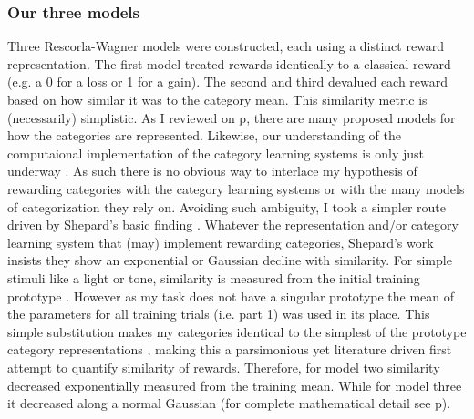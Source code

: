 \documentclass[doc,12pt]{apa}        %
\begin{document}
\subsubsection{Our three models}
\label{subsub:catquant}
Three Rescorla-Wagner models were constructed, each using a distinct reward representation.  The first model treated rewards identically to a classical reward (e.g. a 0 for a loss or 1 for a gain).  The second and third devalued each reward based on how similar it was to the category mean.  This similarity metric is (necessarily) simplistic.  As I reviewed on p\pageref{subsub:curves}, there are many proposed models for how the categories are represented.  Likewise, our understanding of the computaional implementation of the category learning systems is only just underway \cite{Ashby:2005p9152,Ashby:2006p9153}.  As such there is no obvious way to interlace my hypothesis of rewarding categories with the category learning systems or with the many models of categorization they rely on.  Avoiding such ambiguity, I took a simpler route driven by Shepard's basic finding \cite{Shepard:1987p9102}.  Whatever the representation and/or category learning system that (may) implement rewarding categories, Shepard's work insists they show an exponential or Gaussian decline with similarity.  For simple stimuli like a light or tone, similarity is measured from the initial training prototype \cite{Guttman:1956p8355}.  However as my task does not have a singular prototype the mean of the parameters for all training trials (i.e. part 1) was used in its place.  This simple substitution makes my categories identical to the simplest of the prototype category representations \cite{Rosch:1973p9108,Ashby:1995p9109}, making this a parsimonious yet literature driven first attempt to quantify similarity of rewards.  Therefore, for model two similarity decreased exponentially measured from the training mean.  While for model three it decreased along a normal Gaussian (for complete mathematical detail see p\pageref{subsub:codesandfits}).  
\end{document}
